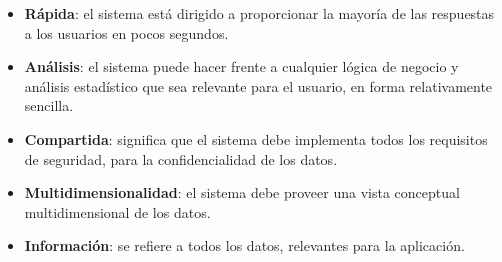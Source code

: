 \documentclass{fancyslides}
\begin{document}
\begin{frame}
\misc
{
\begin{itemize}
  \item \textbf{Rápida}: el sistema está dirigido a proporcionar la mayoría de las respuestas a los usuarios en pocos segundos.
  \item \textbf{Análisis}: el sistema puede hacer frente a cualquier lógica de negocio y análisis estadístico que sea relevante para el usuario, en forma relativamente sencilla.
  \item \textbf{Compartida}: significa que el sistema debe implementa todos los requisitos de seguridad, para la confidencialidad de los datos.
  \item \textbf{Multidimensionalidad}: el sistema debe proveer una vista conceptual multidimensional de los datos.
  \item \textbf{Información}: se refiere a todos los datos, relevantes para la aplicación.
\end{itemize}
}
\end{frame}


\begin{frame}
\end{frame}

\begin{frame}
\end{frame}

\begin{frame}
\end{frame}

\begin{frame}
\end{frame}

\begin{frame}
\end{frame}
\end{document}
